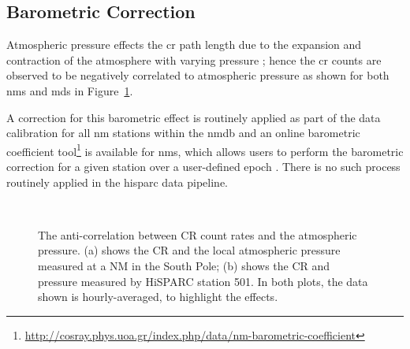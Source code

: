 

\subsection{Barometric Correction}\label{sec:HS_P_corr}


Atmospheric pressure effects the \gls{cr} path length due to the expansion and contraction of the atmosphere with varying pressure \citep{dorman_theory_1972, paschalis_online_2013}; hence the \gls{cr} counts are observed to be negatively correlated to atmospheric pressure as shown for both \glspl{nm} and \glspl{md} in Figure~\ref{fig:CR_V_P}. 

A correction for this barometric effect is routinely applied as part of the data calibration for all \gls{nm} stations within the \gls{nmdb} and an online barometric coefficient tool\footnote{\url{http://cosray.phys.uoa.gr/index.php/data/nm-barometric-coefficient}} is available for \glspl{nm}, which allows users to perform the barometric correction for a given station over a user-defined epoch \citep{paschalis_online_2013}. There is no such process routinely applied in the \gls{hisparc} data pipeline.


\begin{figure}[ht!]
	\centering
	 \\
	
	\caption{The anti-correlation between CR count rates and the atmospheric pressure. (a) shows the CR and the local atmospheric pressure measured at a NM in the South Pole; (b) shows the CR and pressure measured by HiSPARC station 501. In both plots, the data shown is hourly-averaged, to highlight the effects.}
	\label{fig:CR_V_P}
\end{figure}


